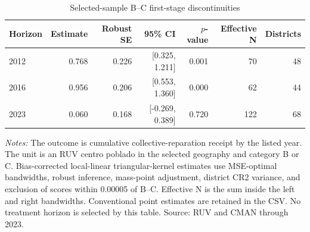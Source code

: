 \begin{table}[!htbp]
\centering
\small
\caption{Selected-sample B--C first-stage discontinuities}
\label{tab:rd_validation_first_stage}
\begin{tabular}{lrrrrrr}
\toprule
Horizon & Estimate & Robust SE & 95\% CI & \(p\)-value & Effective N & Districts \\
\midrule
2012 & 0.768 & 0.226 & [0.325, 1.211] & 0.001 & 70 & 48 \\
2016 & 0.956 & 0.206 & [0.553, 1.360] & 0.000 & 62 & 44 \\
2023 & 0.060 & 0.168 & [-0.269, 0.389] & 0.720 & 122 & 68 \\
\bottomrule
\end{tabular}
\parbox{0.97\linewidth}{\footnotesize \textit{Notes:} The outcome is cumulative collective-reparation receipt by the listed year. The unit is an RUV centro poblado in the selected geography and category B or C. Bias-corrected local-linear triangular-kernel estimates use MSE-optimal bandwidths, robust inference, mass-point adjustment, district CR2 variance, and exclusion of scores within 0.00005 of B--C. Effective N is the sum inside the left and right bandwidths. Conventional point estimates are retained in the CSV. No treatment horizon is selected by this table. Source: RUV and CMAN through 2023.}
\end{table}
